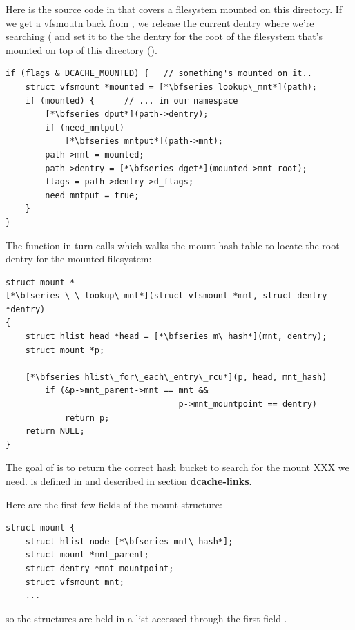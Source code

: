 Here is the source code in  that covers a filesystem mounted on this directory. If we get a vfsmoutn back from , we release the current dentry where we're searching ( and set it to the the dentry for the root of the filesystem that's mounted on top of this directory ().

\begin{lstlisting}
if (flags & DCACHE_MOUNTED) {   // something's mounted on it..
    struct vfsmount *mounted = [*\bfseries lookup\_mnt*](path);
    if (mounted) {      // ... in our namespace
        [*\bfseries dput*](path->dentry);
        if (need_mntput)
            [*\bfseries mntput*](path->mnt);
        path->mnt = mounted;
        path->dentry = [*\bfseries dget*](mounted->mnt_root);
        flags = path->dentry->d_flags;
        need_mntput = true;
    }   
}  
\end{lstlisting}

\noindent
The  function in turn calls  which walks the mount hash table to locate the root dentry for the mounted filesystem:

\begin{lstlisting}
struct mount *
[*\bfseries \_\_lookup\_mnt*](struct vfsmount *mnt, struct dentry *dentry)
{
    struct hlist_head *head = [*\bfseries m\_hash*](mnt, dentry);
    struct mount *p;

    [*\bfseries hlist\_for\_each\_entry\_rcu*](p, head, mnt_hash)
        if (&p->mnt_parent->mnt == mnt && 
                                   p->mnt_mountpoint == dentry)
            return p;
    return NULL;
}
\end{lstlisting}

\noindent
The goal of  is to return the correct hash bucket to search for the mount XXX we need.   is defined in  and described in section \textbf{dcache-links}. 

\noindent
Here are the first few fields of the mount structure:

\begin{lstlisting}
struct mount {
    struct hlist_node [*\bfseries mnt\_hash*];
    struct mount *mnt_parent;
    struct dentry *mnt_mountpoint;
    struct vfsmount mnt;
    ...
\end{lstlisting}

\noindent
so the  structures are held in a list accessed through the first field .

